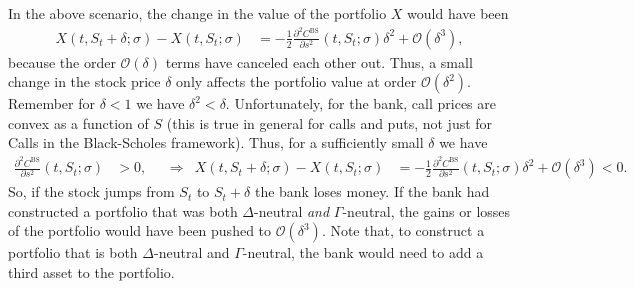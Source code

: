\documentclass[12pt]{book}
\numberwithin{equation}{chapter}
\theoremstyle{plain}
\numberwithin{theorem}{section}
\theoremstyle{definition}
\numberwithin{exercise}{chapter}
\newcommand{\<}{\langle}
\renewcommand{\>}{\rangle}
\renewcommand{\(}{\left(}
\renewcommand{\)}{\right)}
\renewcommand{\[}{\left[}
\renewcommand{\]}{\right]}
\newcommand\Oc{\mathscr{O}}
\newcommand\sig{\sigma}
\newcommand\Gam{\Gamma}
\newcommand\del{\delta}
\newcommand\Del{\Delta}
\renewcommand\d{\partial}
\newcommand\BS{\textrm{BS}}
\theoremstyle{definition}
\numberwithin{question}{section}
\begin{document}
In the above scenario, the change in the value of the portfolio $X$ would have been
\begin{align}
X(t,S_t+\del;\sig) - X(t,S_t;\sig)
	&=	- \frac{1}{2} \frac{\d^2 C^\BS}{\d s^2}(t,S_t;\sig) \del^2 + \Oc(\del^3) ,
\end{align}
because the order $\Oc(\del)$ terms have canceled each other out.
Thus, a small change in the stock price $\del$ only affects the portfolio value at order $\Oc(\del^2)$.  Remember for $\del<1$ we have $\del^2 < \del$.  Unfortunately, for the bank, call prices are convex as a function of $S$ (this is true in general for calls and puts, not just for Calls in the Black-Scholes framework).  Thus, for a sufficiently small $\del$ we have
\begin{align}
\frac{\d^2 C^\BS}{\d s^2}(t,S_t;\sig)
	&> 0 , &
	&\Rightarrow&
X(t,S_t+\del;\sig) - X(t,S_t;\sig)
	&= - \frac{1}{2} \frac{\d^2 C^\BS}{\d s^2}(t,S_t;\sig) \del^2 + \Oc(\del^3) < 0 .
\end{align}
So, if the stock jumps from $S_t$ to $S_t + \del $ the bank loses money.  If the bank had constructed a portfolio that was both $\Delta$-neutral \textit{and} $\Gamma$-neutral, the gains or losses of the portfolio would have been pushed to $\Oc(\del^3)$.  Note that, to construct a portfolio that is both $\Del$-neutral and $\Gam$-neutral, the bank would need to add a third asset to the portfolio.
\end{document}
